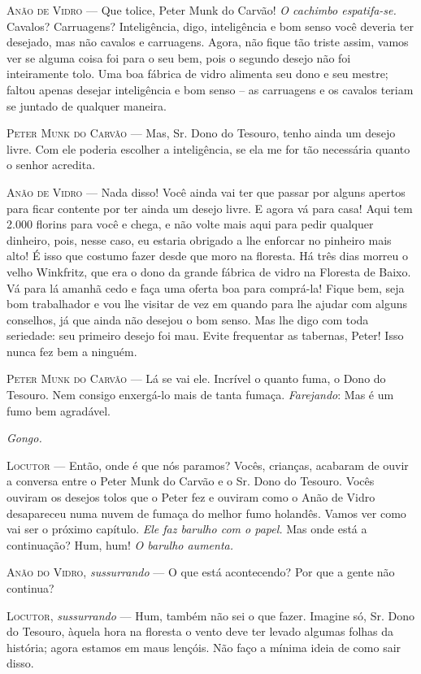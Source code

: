 \textsc{Anão de Vidro} --- Que tolice, Peter Munk do Carvão! \emph{O cachimbo
espatifa-se.} Cavalos? Carruagens? Inteligência, digo, inteligência e
bom senso você deveria ter desejado, mas não cavalos e carruagens.
Agora, não fique tão triste assim, vamos ver se alguma coisa foi para o
seu bem, pois o segundo desejo não foi inteiramente tolo. Uma boa
fábrica de vidro alimenta seu dono e seu mestre; faltou apenas desejar
inteligência e bom senso -- as carruagens e os cavalos teriam se juntado
de qualquer maneira.

\textsc{Peter Munk do Carvão} --- Mas, Sr. Dono do Tesouro, tenho ainda um desejo
livre. Com ele poderia escolher a inteligência, se ela me for tão
necessária quanto o senhor acredita.

\textsc{Anão de Vidro} --- Nada disso! Você ainda vai ter que passar por alguns
apertos para ficar contente por ter ainda um desejo livre. E agora vá
para casa! Aqui tem 2.000 florins para você e chega, e não volte mais
aqui para pedir qualquer dinheiro, pois, nesse caso, eu estaria obrigado
a lhe enforcar no pinheiro mais alto! É isso que costumo fazer desde que
moro na floresta. Há três dias morreu o velho Winkfritz, que era o dono
da grande fábrica de vidro na Floresta de Baixo. Vá para lá amanhã cedo
e faça uma oferta boa para comprá-la! Fique bem, seja bom trabalhador e
vou lhe visitar de vez em quando para lhe ajudar com alguns conselhos,
já que ainda não desejou o bom senso. Mas lhe digo com toda seriedade:
seu primeiro desejo foi mau. Evite frequentar as tabernas, Peter! Isso
nunca fez bem a ninguém.

\textsc{Peter Munk do Carvão} --- Lá se vai ele. Incrível o quanto fuma, o Dono do
Tesouro. Nem consigo enxergá-lo mais de tanta fumaça. \emph{Farejando}:
Mas é um fumo bem agradável.

\emph{Gongo.}

\textsc{Locutor} --- Então, onde é que nós paramos? Vocês, crianças, acabaram de
ouvir a conversa entre o Peter Munk do Carvão e o Sr. Dono do Tesouro.
Vocês ouviram os desejos tolos que o Peter fez e ouviram como o Anão de
Vidro desapareceu numa nuvem de fumaça do melhor fumo holandês. Vamos
ver como vai ser o próximo capítulo. \emph{Ele faz barulho com o papel.}
Mas onde está a continuação? Hum, hum! \emph{O barulho aumenta.}

\textsc{Anão do Vidro}, \emph{sussurrando} --- O que está acontecendo? Por que a
gente não continua?

\textsc{Locutor}, \emph{sussurrando} --- Hum, também não sei o que fazer. Imagine
só, Sr. Dono do Tesouro, àquela hora na floresta o vento deve ter levado
algumas folhas da história; agora estamos em maus lençóis. Não faço a
mínima ideia de como sair disso.

